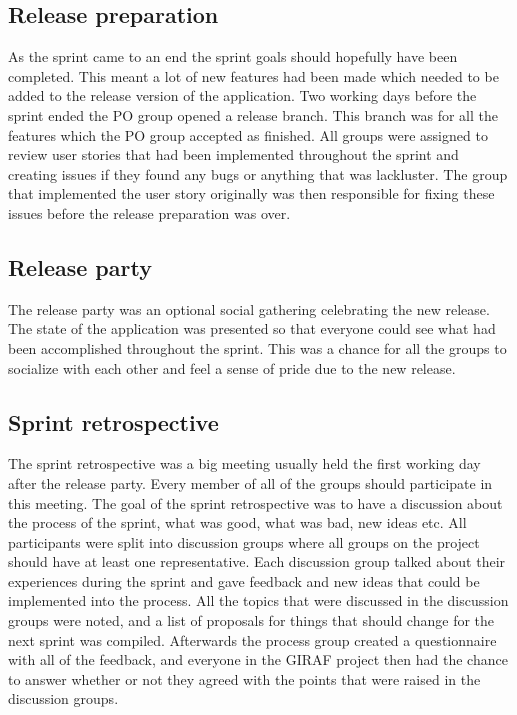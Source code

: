 \subsection{Release preparation}
As the sprint came to an end the sprint goals should hopefully have been completed.
This meant a lot of new features had been made which needed to be added to the release version of the application.
Two working days before the sprint ended the PO group opened a release branch.
This branch was for all the features which the PO group accepted as finished.
All groups were assigned to review user stories that had been implemented throughout the sprint and creating issues if they found any bugs or anything that was lackluster.
The group that implemented the user story originally was then responsible for fixing these issues before the release preparation was over.

\subsection{Release party}
The release party was an optional social gathering celebrating the new release. 
The state of the application was presented so that everyone could see what had been accomplished throughout the sprint.
This was a chance for all the groups to socialize with each other and feel a sense of pride due to the new release.

\subsection{Sprint retrospective}
The sprint retrospective was a big meeting usually held the first working day after the release party.
Every member of all of the groups should participate in this meeting.
The goal of the sprint retrospective was to have a discussion about the process of the sprint, what was good, what was bad, new ideas etc.
All participants were split into discussion groups where all groups on the project should have at least one representative.
\newline
\newline
Each discussion group talked about their experiences during the sprint and gave feedback and new ideas that could be implemented into the process.
All the topics that were discussed in the discussion groups were noted, and a list of proposals for things that should change for the next sprint was compiled.
Afterwards the process group created a questionnaire with all of the feedback, and everyone in the GIRAF project then had the chance to answer whether or not they agreed with the points that were raised in the discussion groups.

